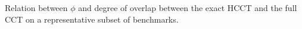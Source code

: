 \label{fig:hcct-overlap} Relation between $\phi$ and degree of overlap between the exact HCCT and the full CCT on a representative subset of benchmarks.
